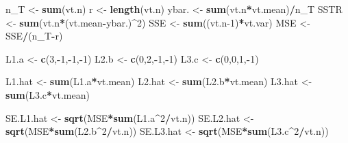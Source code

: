 \documentclass[
]{book}
\newenvironment{Shaded}{\begin{snugshade}}{\end{snugshade}}
\newcommand{\DecValTok}[1]{\textcolor[rgb]{0.00,0.00,0.81}{#1}}
\newcommand{\FunctionTok}[1]{\textcolor[rgb]{0.13,0.29,0.53}{\textbf{#1}}}
\newcommand{\NormalTok}[1]{#1}
\newcommand{\OtherTok}[1]{\textcolor[rgb]{0.56,0.35,0.01}{#1}}
\newcommand{\SpecialCharTok}[1]{\textcolor[rgb]{0.81,0.36,0.00}{\textbf{#1}}}
\begin{document}
\begin{Shaded}
\begin{Highlighting}[]
\NormalTok{n\_T }\OtherTok{\textless{}{-}} \FunctionTok{sum}\NormalTok{(vt.n)}
\NormalTok{r }\OtherTok{\textless{}{-}} \FunctionTok{length}\NormalTok{(vt.n)}
\NormalTok{ybar. }\OtherTok{\textless{}{-}} \FunctionTok{sum}\NormalTok{(vt.n}\SpecialCharTok{*}\NormalTok{vt.mean)}\SpecialCharTok{/}\NormalTok{n\_T}
\NormalTok{SSTR }\OtherTok{\textless{}{-}} \FunctionTok{sum}\NormalTok{(vt.n}\SpecialCharTok{*}\NormalTok{(vt.mean}\SpecialCharTok{{-}}\NormalTok{ybar.)}\SpecialCharTok{\^{}}\DecValTok{2}\NormalTok{)}
\NormalTok{SSE }\OtherTok{\textless{}{-}} \FunctionTok{sum}\NormalTok{((vt.n}\DecValTok{{-}1}\NormalTok{)}\SpecialCharTok{*}\NormalTok{vt.var)}
\NormalTok{MSE }\OtherTok{\textless{}{-}}\NormalTok{ SSE}\SpecialCharTok{/}\NormalTok{(n\_T}\SpecialCharTok{{-}}\NormalTok{r)}

\NormalTok{L1.a }\OtherTok{\textless{}{-}} \FunctionTok{c}\NormalTok{(}\DecValTok{3}\NormalTok{,}\SpecialCharTok{{-}}\DecValTok{1}\NormalTok{,}\SpecialCharTok{{-}}\DecValTok{1}\NormalTok{,}\SpecialCharTok{{-}}\DecValTok{1}\NormalTok{)}
\NormalTok{L2.b }\OtherTok{\textless{}{-}} \FunctionTok{c}\NormalTok{(}\DecValTok{0}\NormalTok{,}\DecValTok{2}\NormalTok{,}\SpecialCharTok{{-}}\DecValTok{1}\NormalTok{,}\SpecialCharTok{{-}}\DecValTok{1}\NormalTok{)}
\NormalTok{L3.c }\OtherTok{\textless{}{-}} \FunctionTok{c}\NormalTok{(}\DecValTok{0}\NormalTok{,}\DecValTok{0}\NormalTok{,}\DecValTok{1}\NormalTok{,}\SpecialCharTok{{-}}\DecValTok{1}\NormalTok{)}

\NormalTok{L1.hat }\OtherTok{\textless{}{-}} \FunctionTok{sum}\NormalTok{(L1.a}\SpecialCharTok{*}\NormalTok{vt.mean)}
\NormalTok{L2.hat }\OtherTok{\textless{}{-}} \FunctionTok{sum}\NormalTok{(L2.b}\SpecialCharTok{*}\NormalTok{vt.mean)}
\NormalTok{L3.hat }\OtherTok{\textless{}{-}} \FunctionTok{sum}\NormalTok{(L3.c}\SpecialCharTok{*}\NormalTok{vt.mean)}

\NormalTok{SE.L1.hat }\OtherTok{\textless{}{-}} \FunctionTok{sqrt}\NormalTok{(MSE}\SpecialCharTok{*}\FunctionTok{sum}\NormalTok{(L1.a}\SpecialCharTok{\^{}}\DecValTok{2}\SpecialCharTok{/}\NormalTok{vt.n))}
\NormalTok{SE.L2.hat }\OtherTok{\textless{}{-}} \FunctionTok{sqrt}\NormalTok{(MSE}\SpecialCharTok{*}\FunctionTok{sum}\NormalTok{(L2.b}\SpecialCharTok{\^{}}\DecValTok{2}\SpecialCharTok{/}\NormalTok{vt.n))}
\NormalTok{SE.L3.hat }\OtherTok{\textless{}{-}} \FunctionTok{sqrt}\NormalTok{(MSE}\SpecialCharTok{*}\FunctionTok{sum}\NormalTok{(L3.c}\SpecialCharTok{\^{}}\DecValTok{2}\SpecialCharTok{/}\NormalTok{vt.n))}


\end{Highlighting}
\end{Shaded}
\end{document}
